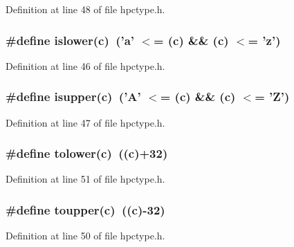 Definition at line 48 of file hpctype.h.
\subsubsection{\setlength{\rightskip}{0pt plus 5cm}\#define islower(c)\ ('a' $<$= (c) \&\& (c) $<$= 'z')}\label{hpctype_8h_a0}




Definition at line 46 of file hpctype.h.
\subsubsection{\setlength{\rightskip}{0pt plus 5cm}\#define isupper(c)\ ('A' $<$= (c) \&\& (c) $<$= 'Z')}\label{hpctype_8h_a1}




Definition at line 47 of file hpctype.h.
\subsubsection{\setlength{\rightskip}{0pt plus 5cm}\#define tolower(c)\ ((c)+32)}\label{hpctype_8h_a5}




Definition at line 51 of file hpctype.h.
\subsubsection{\setlength{\rightskip}{0pt plus 5cm}\#define toupper(c)\ ((c)-32)}\label{hpctype_8h_a4}




Definition at line 50 of file hpctype.h.